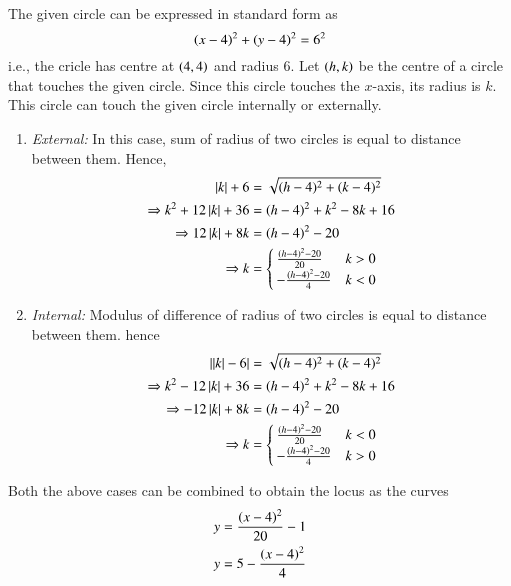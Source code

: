 The given circle can be expressed in standard form as
%
\begin{equation}
\left(x-4\right)^2 + \left(y-4\right)^2 = 6^2
\end{equation}
%
i.e., the cricle has centre at $\left(4,4\right)$ and radius 6.
Let $\left(h,k\right)$ be the centre of a circle that touches the given circle. Since this  circle touches the $x$-axis, its radius is $k$. This circle can touch the given circle internally or externally.
\begin{enumerate}
\item {\em External:}  In this case, sum of radius of two circles is equal to distance between them.  Hence, 
%
\begin{align}
|k|+6&=\sqrt{(h-4)^{2}+(k-4)^{2}}
\\
\Rightarrow k^2 + 12\left\vert k\right\vert + 36 &= \left(h-4\right)^2 + k^2 -8k + 16 \\
\Rightarrow  12\left\vert k\right\vert +8k &= \left(h-4\right)^2 - 20\\
\Rightarrow  k &= 
\begin{cases}
\frac{\left(h-4\right)^2 - 20}{20} & k  > 0
\\
-\frac{\left(h-4\right)^2 - 20}{4} & k < 0
\end{cases}
\end{align}
%
\item {\em Internal:} Modulus of difference of radius of two circles is equal to distance between them.  hence
%
\begin{align}
\left\vert|k|-6\right\vert&=\sqrt{(h-4)^{2}+(k-4)^{2}}
\\
\Rightarrow k^2 - 12\left\vert k\right\vert + 36 &= \left(h-4\right)^2 + k^2 -8k + 16 \\
\Rightarrow  -12\left\vert k\right\vert +8k &= \left(h-4\right)^2 - 20\\
\Rightarrow  k &= 
\begin{cases}
\frac{\left(h-4\right)^2 - 20}{20} & k  < 0
\\
-\frac{\left(h-4\right)^2 - 20}{4} & k > 0
\end{cases}
\end{align}
%
\end{enumerate}
%
Both the above cases can be combined to obtain the locus as the curves
%
\begin{align}
y &= \frac{\left(x-4\right)^2 }{20} - 1
\\
y &= 5 - \frac{\left(x-4\right)^2 }{4} 
\end{align}
%
